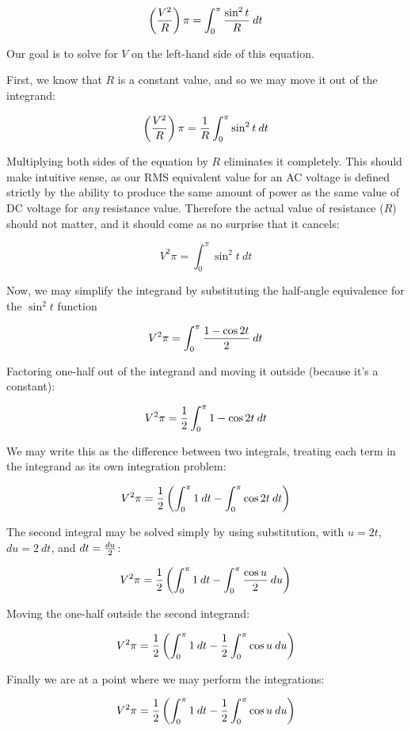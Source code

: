 $$\left({V^2 \over R} \right) \pi = \int_0^\pi {{\sin^2 t} \over R} \> dt$$

Our goal is to solve for $V$ on the left-hand side of this equation.

\filbreak

First, we know that $R$ is a constant value, and so we may move it out of the integrand:

$$\left({V^2 \over R} \right) \pi = {1 \over R} \int_0^\pi \sin^2 t \> dt$$

Multiplying both sides of the equation by $R$ eliminates it completely.  This should make intuitive sense, as our RMS equivalent value for an AC voltage is defined strictly by the ability to produce the same amount of power as the same value of DC voltage for \textit{any} resistance value.  Therefore the actual value of resistance ($R$) should not matter, and it should come as no surprise that it cancels:

$$V^2 \pi = \int_0^\pi \sin^2 t \> dt$$

Now, we may simplify the integrand by substituting the half-angle equivalence for the $\sin^2 t$ function

$$V^2 \pi = \int_0^\pi {{1 - \cos 2t} \over 2} \> dt$$

Factoring one-half out of the integrand and moving it outside (because it's a constant):

$$V^2 \pi = {1 \over 2}\int_0^\pi 1 - \cos 2t \> dt$$

We may write this as the difference between two integrals, treating each term in the integrand as its own integration problem:

$$V^2 \pi = {1 \over 2} \left( \int_0^\pi 1 \> dt - \int_0^\pi \cos 2t \> dt \right)$$

The second integral may be solved simply by using substitution, with $u = 2t$, $du = 2 \> dt$, and $dt = {du \over 2}$:

$$V^2 \pi = {1 \over 2} \left( \int_0^\pi 1 \> dt - \int_0^\pi {\cos u \over 2} \> du \right)$$

Moving the one-half outside the second integrand:

$$V^2 \pi = {1 \over 2} \left( \int_0^\pi 1 \> dt - {1 \over 2}\int_0^\pi \cos u \> du \right)$$

\filbreak

Finally we are at a point where we may perform the integrations:

$$V^2 \pi = {1 \over 2} \left( \int_0^\pi 1 \> dt - {1 \over 2}\int_0^\pi \cos u \> du \right)$$


